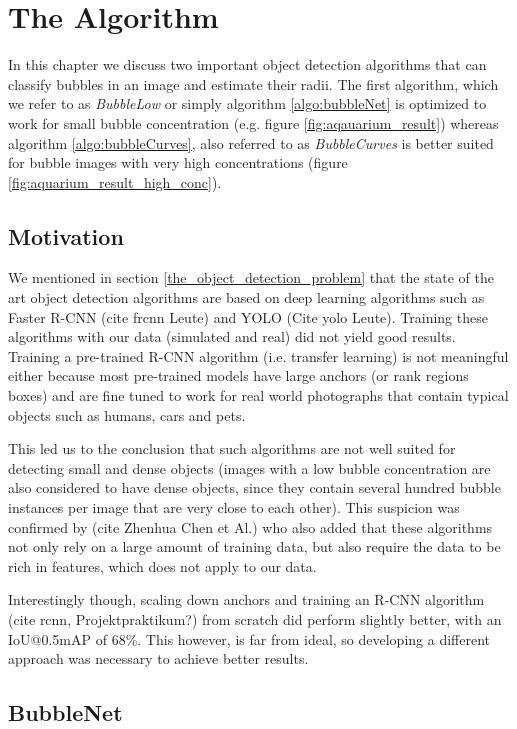 \chapter{The Algorithm} \label{the_algorithm}
	In this chapter we discuss two important object detection algorithms that can classify bubbles in an image and estimate their radii. The first algorithm, which we refer to as \textit{BubbleLow} or simply algorithm \ref{algo:bubbleNet} is optimized to work for small bubble concentration (e.g. figure \ref{fig:aqauarium_result}) whereas algorithm \ref{algo:bubbleCurves}, also referred to as \textit{BubbleCurves} is better suited for bubble images with very high concentrations (figure \ref{fig:aquarium_result_high_conc}).
		
	\section{Motivation}
		We mentioned in section \ref{the_object_detection_problem} that the state of the art object detection algorithms are based on deep learning algorithms such as Faster R-CNN (cite frcnn Leute) and YOLO (Cite yolo Leute). Training these algorithms with our data (simulated and real) did not yield good results. Training a pre-trained R-CNN algorithm (i.e. transfer learning) is not meaningful either because most pre-trained models have large anchors (or rank regions boxes) and are fine tuned to work for real world photographs that contain typical objects such as humans, cars and pets. 
		
		This led us to the conclusion that such algorithms are not well suited for detecting small and dense objects (images with a low bubble concentration are also considered to have dense objects, since they contain several hundred bubble instances per image that are very close to each other). This suspicion was confirmed by (cite Zhenhua Chen et Al.) who also added that these algorithms not only rely on a large amount of training data, but also require the data to be rich in features, which does not apply to our data. 
		
	Interestingly though, scaling down anchors and training an R-CNN algorithm (cite rcnn, Projektpraktikum?) from scratch did perform slightly better, with an IoU@0.5mAP of 68\%. This however, is far from ideal, so developing a different approach was necessary to achieve better results. 
		
		
		
		
	\section{BubbleNet}\label{BubbleNet}
	
